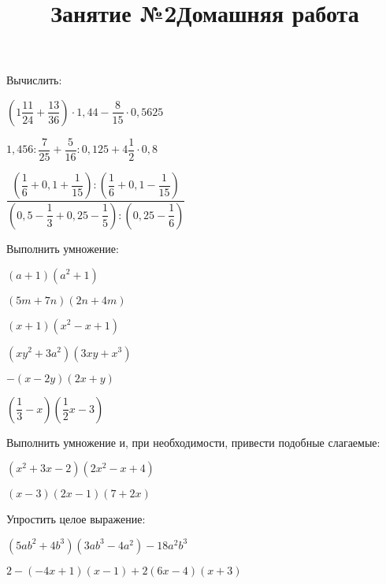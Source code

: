 \documentclass[12pt, a4paper]{article}
\begin{document}
	\title{Занятие №2}
	\begin{enumcols}[label=\textbf{\arabic*.}]
		\item Вычислить:
		\begin{enumcols}[itemcolumns=2]
			\item \( \left( 1\dfrac{11}{24}+\dfrac{13}{36} \right)\cdot1,44-\dfrac{8}{15}\cdot0,5625 \)
			\item \( 1,456:\dfrac{7}{25}+\dfrac{5}{16}:0,125+4\dfrac{1}{2}\cdot0,8 \)
			\item \( \dfrac{\left( \dfrac{1}{6}+0,1+\dfrac{1}{15} \right):\left( \dfrac{1}{6}+0,1-\dfrac{1}{15} \right)}{\left( 0,5-\dfrac{1}{3}+0,25-\dfrac{1}{5} \right):\left( 0,25-\dfrac{1}{6} \right)} \)
		\end{enumcols}
		\item Выполнить умножение:
		\begin{enumcols}[itemcolumns=3]
			\item \( (a+1)(a^2+1) \)
			\item \( (5m+7n)(2n+4m) \)
			\item \( (x+1)(x^2-x+1) \)
			\item \( (xy^2+3a^2)(3xy+x^3) \)
			\item \( -(x-2y)(2x+y) \)
			\item \( \left( \dfrac{1}{3}-x \right)\left( \dfrac{1}{2}x-3 \right) \)
		\end{enumcols}
		\item Выполнить умножение и, при необходимости, привести подобные слагаемые:
		\begin{enumcols}[itemcolumns=2]
			\item \( (x^2+3x-2)(2x^2-x+4) \)
			\item \( (x-3)(2x-1)(7+2x) \)
		\end{enumcols}
		\item Упростить целое выражение:
		\begin{enumcols}[itemcolumns=2]
			\item \( (5ab^2+4b^3)(3ab^3-4a^2)-18a^2b^3 \)
			\item \( 2-(-4x+1)(x-1)+2(6x-4)(x+3) \)
		\end{enumcols}
	\end{enumcols}
	\title{Домашняя работа}
\end{document}
